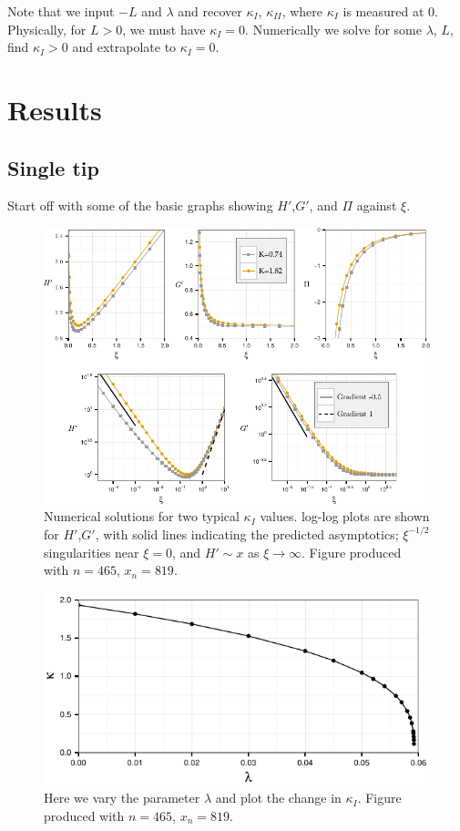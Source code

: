 \documentclass{jfm}
\begin{document}
Note that we input $-L$ and $\lambda$ and recover $\kappa_I$, $\kappa_{II}$, where 
$\kappa_I$ is measured at $0$. Physically, for $L>0$, we must have
$\kappa_I=0$. Numerically we solve for some $\lambda$, $L$, find $\kappa_I >0$ 
and extrapolate to $\kappa_I=0$.


%
%
% 
\clearpage
\section{Results}\label{sec:Results}
%
%
%
\subsection{Single tip}
Start off with some of the basic graphs showing $H'$,$G'$, and $\Pi$ against
$\xi$.
\begin{figure}
  \centerline{\includegraphics{./../../Graphs/hprime-p-x-full-edited.pdf}}
  \caption{Numerical solutions for two typical $\kappa_I$ values. log-log plots
           are shown for $H'$,$G'$, with solid lines indicating the predicted 
           asymptotics; $\xi^{-1/2}$ singularities near $\xi=0$, and  $H' \sim x$ 
           as $\xi \to \infty$. Figure produced with $n=465$, $x_n=819$.}
\end{figure}
\begin{figure}
  \centerline{\includegraphics{./../../Graphs/K-lambda.pdf}}
  \caption{Here we vary the parameter $\lambda$ and plot the change in 
           $\kappa_I$. Figure produced with $n=465$, $x_n = 819$.}
\end{figure}
\end{document}
